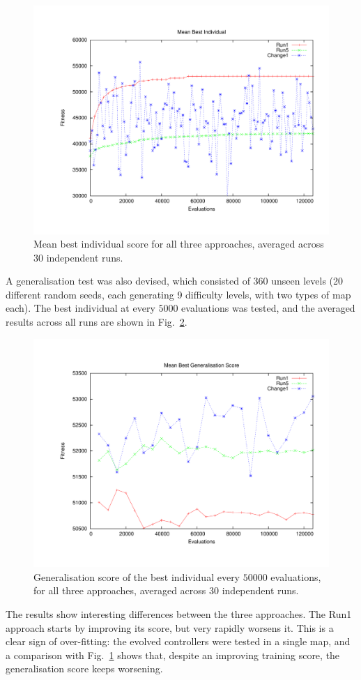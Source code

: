 \documentclass[conference]{IEEEtran}
\begin{document}
\begin{figure}[ht]
	\begin{center}
	\includegraphics[width = .48\textwidth]{images/mbi}
	\caption{Mean best individual score for all three approaches, averaged
	across 30 independent runs.}
	\label{fig:training}
	\end{center}
\end{figure}

A generalisation test was also devised, which consisted of 360 unseen levels
(20 different random seeds, each generating 9 difficulty levels, with two types
of map each). The best individual at every $5000$ evaluations was tested, and
the averaged results across all runs are shown in Fig.~\ref{fig:generalisation}.

\begin{figure}[ht]
	\begin{center}
	\includegraphics[width = .48\textwidth]{images/mbg}
	\caption{Generalisation score of the best individual every $50000$
	evaluations,  for all three approaches, averaged across 30 independent
	runs.}
	\label{fig:generalisation}
	\end{center}
\end{figure}

The results show interesting differences between the three approaches. The Run1
approach starts by improving its score, but very rapidly worsens it.
This is a clear sign of over-fitting: the evolved controllers were tested in a
single map, and a comparison with Fig.~\ref{fig:training} shows that,
despite an improving training score, the generalisation score keeps worsening.
\end{document}
